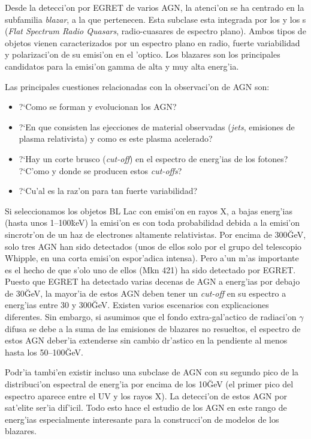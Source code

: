 \AGNclassificationfig

Desde la detecci'on por EGRET de varios AGN, la atenci'on se ha
centrado en la subfamilia \emph{blazar}, a la que pertenecen.  Esta
subclase esta integrada por los \emph{} y los
s (\emph{Flat Spectrum Radio Quasars}, radio-cuasares de
espectro plano). Ambos tipos de objetos vienen caracterizados por un
espectro plano en radio, fuerte variabilidad y polarizaci'on de su
emisi'on en el 'optico. Los blazares son los principales candidatos
para la emisi'on gamma de alta y muy alta energ'ia.

Las principales cuestiones relacionadas con la observaci'on de AGN
son:
%
\begin{itemize}
\item ?`Como se forman y evolucionan los AGN?
%
\item ?`En que consisten las ejecciones de material observadas
  (\emph{jets}, emisiones de plasma relativista) y como es este plasma
  acelerado?
%
\item ?`Hay un corte brusco (\emph{cut-off}) en el espectro de
  energ'ias de los fotones? ?`C'omo y donde se producen estos
  \emph{cut-offs}?
%
\item ?`Cu'al es la raz'on para tan fuerte variabilidad?
\end{itemize}

Si seleccionamos los objetos BL Lac con emisi'on en rayos X, a bajas
energ'ias (hasta unos 1--100\u{keV}) la emisi'on es con toda
probabilidad debida a la emisi'on sincrotr'on de un haz de electrones
altamente relativistas. Por encima de 300\u{GeV}, solo tres AGN han
sido detectados (unos de ellos solo por el grupo del telescopio
Whipple, en una corta emisi'on espor'adica intensa). Pero a'un m'as
importante es el hecho de que s'olo uno de ellos (Mkn 421) ha sido
detectado por EGRET. Puesto que EGRET ha detectado varias decenas de
AGN a energ'ias por debajo de 30\u{GeV}, la mayor'ia de estos AGN
deben tener un \emph{cut-off} en su espectro a energ'ias entre 30 y
300\u{GeV}. Existen varios escenarios con explicaciones
diferentes. Sin embargo, si asumimos que el fondo extra-gal'actico de
radiaci'on $\gamma$ difusa se debe a la suma de las emisiones de
blazares no resueltos, el espectro de estos AGN deber'ia extenderse
sin cambio dr'astico en la pendiente al menos hasta los
50--100\u{GeV}.

Podr'ia tambi'en existir incluso una subclase de AGN con su segundo
pico de la distribuci'on espectral de energ'ia por encima de los
10\u{GeV} (el primer pico del espectro aparece entre el UV y los rayos
X). La detecci'on de estos AGN por sat'elite ser'ia dif'icil. Todo
esto hace el estudio de los AGN en este rango de energ'ias
especialmente interesante para la construcci'on de modelos de los
blazares.

